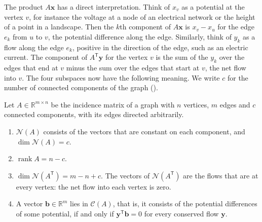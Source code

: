 \begin{figure}
\end{figure}

The product $A\mathbf x$ has a direct interpretation. Think of $x_v$ as a potential at the vertex $v$, for instance the voltage at a node of an electrical network or the height of a point in a landscape. Then the $k$th component of $A\mathbf x$ is $x_v-x_u$ for the edge $e_k$ from $u$ to $v$, the potential difference along the edge. Similarly, think of $y_k$ as a flow along the edge $e_k$, positive in the direction of the edge, such as an electric current. The component of $A^{\mathsf T}\mathbf y$ for the vertex $v$ is the sum of the $y_k$ over the edges that end at $v$ minus the sum over the edges that start at $v$, the net flow into $v$. The four subspaces now have the following meaning. We write $c$ for the number of connected components of the graph ().

\begin{proposition}
\label{prop:incidence}
Let $A\in\mathbb R^{m\times n}$ be the incidence matrix of a graph with $n$ vertices, $m$ edges and $c$ connected components, with its edges directed arbitrarily.
\begin{enumerate}
\item $\mathcal N(A)$ consists of the vectors that are constant on each component, and $\dim\mathcal N(A)=c$.
\item $\operatorname{rank}A=n-c$.
\item $\dim\mathcal N(A^{\mathsf T})=m-n+c$. The vectors of $\mathcal N(A^{\mathsf T})$ are the flows that are  at every vertex: the net flow into each vertex is zero.
\item A vector $\mathbf b\in\mathbb R^m$ lies in $\mathcal C(A)$, that is, it consists of the potential differences of some potential, if and only if $\mathbf y^{\mathsf T}\mathbf b=0$ for every conserved flow $\mathbf y$.
\end{enumerate}
\end{proposition}

